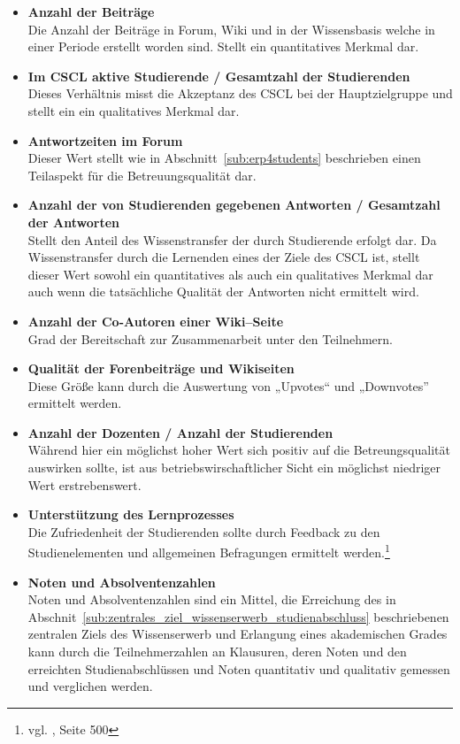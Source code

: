 \begin{itemize}
	\item \textbf{Anzahl der Beiträge}\\ Die Anzahl der Beiträge in Forum, Wiki und in der Wissensbasis welche in einer Periode erstellt worden sind. Stellt ein quantitatives Merkmal dar. 
	\item \textbf{Im CSCL aktive Studierende / Gesamtzahl der Studierenden}\\ Dieses Verhältnis misst die Akzeptanz des \ac{CSCL} bei der Hauptzielgruppe und stellt ein ein qualitatives Merkmal dar.
	\item \textbf{Antwortzeiten im Forum}\\ Dieser Wert stellt wie in Abschnitt~\ref{sub:erp4students} beschrieben einen Teilaspekt für die Betreuungsqualität dar.
	\item \textbf{Anzahl der von Studierenden gegebenen Antworten / Gesamtzahl der Antworten}\\ Stellt den Anteil des Wissenstransfer der durch Studierende erfolgt dar. Da Wissenstransfer durch die Lernenden eines der Ziele des \ac{CSCL} ist, stellt dieser Wert sowohl ein quantitatives als auch ein qualitatives Merkmal dar auch wenn die tatsächliche Qualität der Antworten nicht ermittelt wird.
	\item \textbf{Anzahl der Co-Autoren einer Wiki–Seite}\\ Grad der Bereitschaft zur Zusammenarbeit unter den Teilnehmern.
	\item \textbf{Qualität der Forenbeiträge und Wikiseiten}\\ Diese Größe kann durch die Auswertung von „Upvotes“ und „Downvotes” ermittelt werden.
	\item \textbf{Anzahl der Dozenten / Anzahl der Studierenden}\\ Während hier ein möglichst hoher Wert sich positiv auf die Betreungsqualität auswirken sollte, ist aus betriebswirschaftlicher Sicht ein möglichst niedriger Wert erstrebenswert.
	\item \textbf{Unterstützung des Lernprozesses}\\ Die Zufriedenheit der Studierenden sollte durch Feedback zu den Studienelementen und allgemeinen Befragungen ermittelt werden.\footnote{vgl. \cite{euler}, Seite 500}
	\item \textbf{Noten und Absolventenzahlen}\\ Noten und Absolventenzahlen sind ein Mittel, die Erreichung des in Abschnit~\ref{sub:zentrales_ziel_wissenserwerb_studienabschluss} beschriebenen zentralen Ziels des Wissenserwerb und Erlangung eines akademischen Grades kann durch die Teilnehmerzahlen an Klausuren, deren Noten und den erreichten Studienabschlüssen und Noten quantitativ und qualitativ gemessen und verglichen werden.
\end{itemize}

